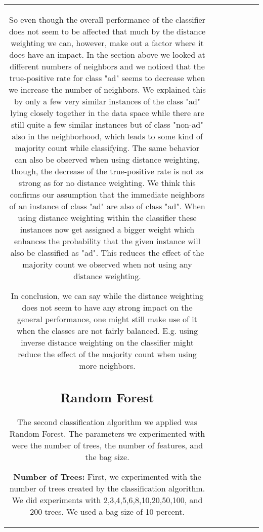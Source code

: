 \documentclass{sig-alternate-05-2015}
\begin{document}
\begin{tabular}{c | c | c | c | c | c | c}
So even though the overall performance of the classifier does not seem to be affected that much by the distance weighting we can, however, make out a factor where it does have an impact. In the section above we looked at different numbers of neighbors and we noticed that the true-positive rate for class "ad" seems to decrease when we increase the number of neighbors. We explained this by only a few very similar instances of the class "ad" lying closely together in the data space while there are still quite a few similar instances but of class "non-ad" also in the neighborhood, which leads to some kind of majority count while classifying. The same behavior can also be observed when using distance weighting, though, the decrease of the true-positive rate is not as strong as for no distance weighting. We think this confirms our assumption that the immediate neighbors of an instance of class "ad" are also of class "ad". When using distance weighting within the classifier these instances now get assigned a bigger weight which enhances the probability that the given instance will also be classified as "ad". This reduces the effect of the majority count we observed when not using any distance weighting.

In conclusion, we can say while the distance weighting does not seem to have any strong impact on the general performance, one might still make use of it when the classes are not fairly balanced. E.g. using inverse distance weighting on the classifier might reduce the effect of the majority count when using more neighbors.


\subsection{Random Forest}
The second classification algorithm we applied was Random Forest. The parameters we experimented with were the number of trees, the number of features, and the bag size.

\textbf{Number of Trees:}
First, we experimented with the number of trees created by the classification algorithm. We did experiments with 2,3,4,5,6,8,10,20,50,100, and 200 trees. We used a bag size of 10 percent.


\end{tabular}
\end{document}
